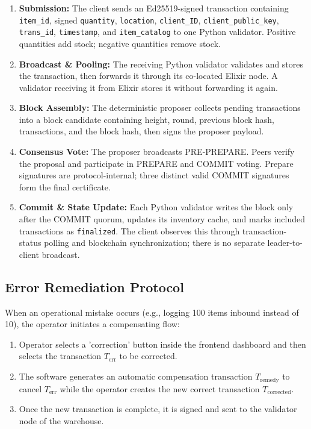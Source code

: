 \documentclass[11pt, a4paper, oneside]{memoir}
\begin{document}
\begin{enumerate}
    \item \textbf{Submission:} The client sends an Ed25519-signed transaction containing \texttt{item\_id}, signed \texttt{quantity}, \texttt{location}, \texttt{client\_ID}, \texttt{client\_public\_key}, \texttt{trans\_id}, \texttt{timestamp}, and \texttt{item\_catalog} to one Python validator. Positive quantities add stock; negative quantities remove stock.
    \item \textbf{Broadcast \& Pooling:} The receiving Python validator validates and stores the transaction, then forwards it through its co-located Elixir node. A validator receiving it from Elixir stores it without forwarding it again.
    \item \textbf{Block Assembly:} The deterministic proposer collects pending transactions into a block candidate containing height, round, previous block hash, transactions, and the block hash, then signs the proposer payload.
    \item \textbf{Consensus Vote:} The proposer broadcasts PRE-PREPARE. Peers verify the proposal and participate in PREPARE and COMMIT voting. Prepare signatures are protocol-internal; three distinct valid COMMIT signatures form the final certificate.
    \item \textbf{Commit \& State Update:} Each Python validator writes the block only after the COMMIT quorum, updates its inventory cache, and marks included transactions as \texttt{finalized}. The client observes this through transaction-status polling and blockchain synchronization; there is no separate leader-to-client broadcast.
\end{enumerate}

\subsection{Error Remediation Protocol}
When an operational mistake occurs (e.g., logging 100 items inbound instead of 10), the operator initiates a compensating flow:
\begin{enumerate}
    \item Operator selects a 'correction' button inside the frontend dashboard and then selects the transaction $T_{\text{err}}$ to be corrected.
    \item The software generates an automatic compensation transaction $T_{\text{remedy}}$ to cancel $T_{\text{err}}$ while the operator creates the new correct transaction $T_{\text{corrected}}$.
    \item Once the new transaction is complete, it is signed and sent to the validator node of the warehouse.
\end{enumerate}
\end{document}
